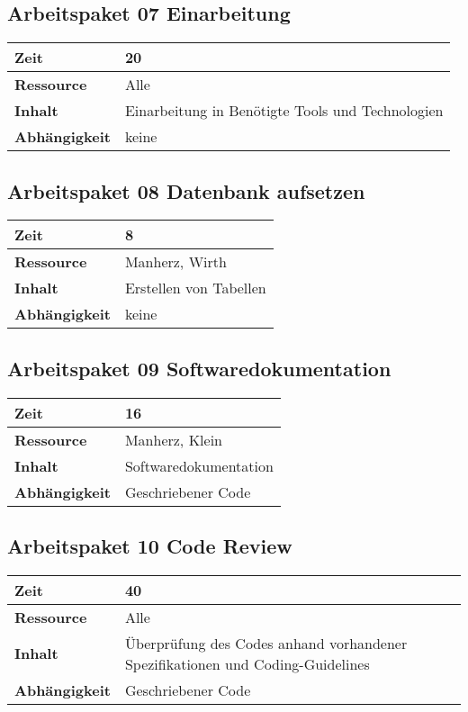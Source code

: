 \documentclass[12pt,a4paper,onecolumn]{article}
\begin{document}
\subsection{Arbeitspaket 07 Einarbeitung}
\begin{tabularx}{\textwidth}{|l|X|}
\hline
     \textbf{Zeit} & 20 \\
     \hline
     \textbf{Ressource} & Alle\\
     \hline
     \textbf{Inhalt} & Einarbeitung in Benötigte Tools und Technologien \\
     \hline
     \textbf{Abhängigkeit} & keine \\
\hline
\end{tabularx}

\subsection{Arbeitspaket 08 Datenbank aufsetzen}
\begin{tabularx}{\textwidth}{|l|X|}
\hline
     \textbf{Zeit} & 8 \\
     \hline
     \textbf{Ressource} & Manherz, Wirth\\
     \hline
     \textbf{Inhalt} &  Erstellen von Tabellen\\
     \hline
     \textbf{Abhängigkeit} & keine\\
\hline
\end{tabularx}

\subsection{Arbeitspaket 09 Softwaredokumentation}
\begin{tabularx}{\textwidth}{|l|X|}
\hline
     \textbf{Zeit} &  16\\
     \hline
     \textbf{Ressource} & Manherz, Klein\\
     \hline
     \textbf{Inhalt} &  Softwaredokumentation\\
     \hline
     \textbf{Abhängigkeit} & Geschriebener Code\\
\hline
\end{tabularx}

\subsection{Arbeitspaket 10 Code Review}
\begin{tabularx}{\textwidth}{|l|X|}
\hline
     \textbf{Zeit} & 40\\
     \hline
     \textbf{Ressource} & Alle\\
     \hline
     \textbf{Inhalt} &  Überprüfung des Codes anhand vorhandener Spezifikationen und Coding-Guidelines\\
     \hline
     \textbf{Abhängigkeit} & Geschriebener Code\\
\hline
\end{tabularx}
\end{document}

